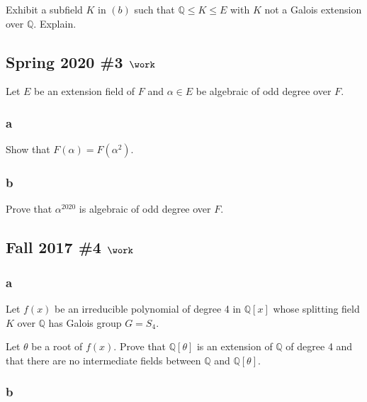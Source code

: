 Exhibit a subfield \(K\) in \((b)\) such that
\({\mathbb{Q}}\leq K \leq E\) with \(K\) not a Galois extension over
\({\mathbb{Q}}\). Explain.

\hypertarget{spring-2020-3-work}{%
\subsection{\texorpdfstring{Spring 2020 \#3
\(\work\)}{Spring 2020 \#3 \textbackslash work}}\label{spring-2020-3-work}}

Let \(E\) be an extension field of \(F\) and \(\alpha\in E\) be
algebraic of odd degree over \(F\).

\hypertarget{a-64}{%
\subsubsection{a}\label{a-64}}

Show that \(F(\alpha) = F(\alpha^2)\).

\hypertarget{b-54}{%
\subsubsection{b}\label{b-54}}

Prove that \(\alpha^{2020}\) is algebraic of odd degree over \(F\).

\hypertarget{fall-2017-4-work}{%
\subsection{\texorpdfstring{Fall 2017 \#4
\(\work\)}{Fall 2017 \#4 \textbackslash work}}\label{fall-2017-4-work}}

\hypertarget{a-65}{%
\subsubsection{a}\label{a-65}}

Let \(f (x)\) be an irreducible polynomial of degree 4 in
\({\mathbb{Q}}[x]\) whose splitting field \(K\) over \({\mathbb{Q}}\)
has Galois group \(G = S_4\).

Let \(\theta\) be a root of \(f(x)\). Prove that
\({\mathbb{Q}}[\theta]\) is an extension of \({\mathbb{Q}}\) of degree 4
and that there are no intermediate fields between \({\mathbb{Q}}\) and
\({\mathbb{Q}}[\theta]\).

\hypertarget{b-55}{%
\subsubsection{b}\label{b-55}}

